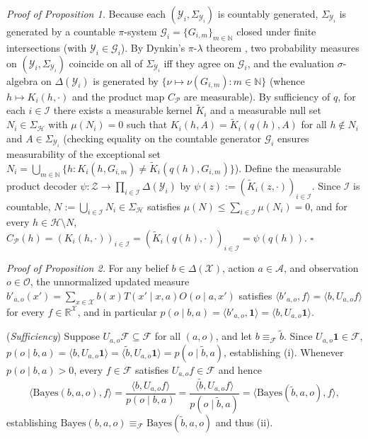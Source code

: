 \documentclass[11pt,a4paper]{article}
\begin{document}
\emph{Proof of Proposition 1.} Because each
\((\mathcal{Y}_i, \Sigma_{\mathcal{Y}_i})\) is countably generated,
\(\Sigma_{\mathcal{Y}_i}\) is generated by a countable \(\pi\)-system
\(\mathcal{G}_i = \{G_{i,m}\}_{m \in \mathbb{N}}\) closed under finite
intersections (with \(\mathcal{Y}_i \in \mathcal{G}_i\)). By Dynkin's
\(\pi\)-\(\lambda\) theorem \citep{kallenberg2021}, two probability
measures on \((\mathcal{Y}_i, \Sigma_{\mathcal{Y}_i})\) coincide on all
of \(\Sigma_{\mathcal{Y}_i}\) iff they agree on \(\mathcal{G}_i\), and
the evaluation \(\sigma\)-algebra on \(\Delta(\mathcal{Y}_i)\) is
generated by \(\{ \nu \mapsto \nu(G_{i,m}) : m \in \mathbb{N}\}\)
(whence \(h \mapsto K_i(h, \cdot)\) and the product map
\(C_{\mathcal{P}}\) are measurable). By sufficiency of \(q\), for each
\(i \in \mathcal{I}\) there exists a measurable kernel
\(\widetilde{K}_i\) and a measurable null set
\(N_i \in \Sigma_{\mathcal{H}}\) with \(\mu(N_i) = 0\) such that
\(K_i(h, A) = \widetilde{K}_i(q(h), A)\) for all \(h \notin N_i\) and
\(A \in \Sigma_{\mathcal{Y}_i}\) (checking equality on the countable
generator \(\mathcal{G}_i\) ensures measurability of the exceptional set
\(N_i = \bigcup_{m \in \mathbb{N}} \{h : K_i(h, G_{i,m}) \neq \widetilde{K}_i(q(h), G_{i,m})\}\)).
Define the measurable product decoder
\(\psi: \mathcal{Z} \to \prod_{i \in \mathcal{I}} \Delta(\mathcal{Y}_i)\)
by \(\psi(z) := (\widetilde{K}_i(z, \cdot))_{i \in \mathcal{I}}\). Since
\(\mathcal{I}\) is countable,
\(N := \bigcup_{i \in \mathcal{I}} N_i \in \Sigma_{\mathcal{H}}\)
satisfies \(\mu(N) \le \sum_{i \in \mathcal{I}} \mu(N_i) = 0\), and for
every \(h \in \mathcal{H} \setminus N\),
\(C_{\mathcal{P}}(h) = (K_i(h,\cdot))_{i \in \mathcal{I}} = (\widetilde{K}_i(q(h),\cdot))_{i \in \mathcal{I}} = \psi(q(h))\).
\(\square\)

\emph{Proof of Proposition 2.} For any belief
\(b \in \Delta(\mathcal{X})\), action \(a \in \mathcal{A}\), and
observation \(o \in \mathcal{O}\), the unnormalized updated measure
\(b'_{a,o}(x') = \sum_{x \in \mathcal{X}} b(x) T(x' \mid x,a) O(o \mid a,x')\)
satisfies \(\langle b'_{a,o}, f\rangle = \langle b, U_{a,o} f\rangle\)
for every \(f \in \mathbb{R}^{\mathcal{X}}\), and in particular
\(p(o \mid b, a) = \langle b'_{a,o}, \mathbf{1}\rangle = \langle b, U_{a,o}\mathbf{1}\rangle\).

(\emph{Sufficiency}) Suppose
\(U_{a,o}\mathcal{F} \subseteq \mathcal{F}\) for all \((a,o)\), and let
\(b \equiv_{\mathcal{F}} \tilde{b}\). Since
\(U_{a,o}\mathbf{1} \in \mathcal{F}\),
\(p(o \mid b, a) = \langle b, U_{a,o}\mathbf{1}\rangle = \langle \tilde{b}, U_{a,o}\mathbf{1}\rangle = p(o \mid \tilde{b}, a)\),
establishing (i). Whenever \(p(o \mid b,a) > 0\), every
\(f \in \mathcal{F}\) satisfies \(U_{a,o}f \in \mathcal{F}\) and hence
\[\langle \mathrm{Bayes}(b,a,o), f\rangle = \frac{\langle b, U_{a,o}f\rangle}{p(o \mid b,a)} = \frac{\langle \tilde{b}, U_{a,o}f\rangle}{p(o \mid \tilde{b},a)} = \langle \mathrm{Bayes}(\tilde{b},a,o), f\rangle,\]
establishing
\(\mathrm{Bayes}(b,a,o) \equiv_{\mathcal{F}} \mathrm{Bayes}(\tilde{b},a,o)\)
and thus (ii).
\end{document}
